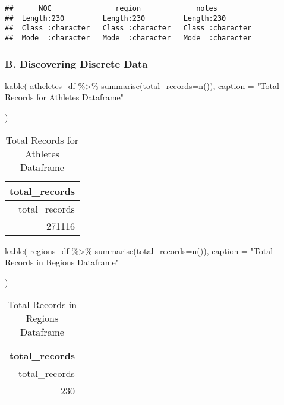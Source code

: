 \documentclass[
]{article}
\newenvironment{Shaded}{\begin{snugshade}}{\end{snugshade}}
\newcommand{\AttributeTok}[1]{\textcolor[rgb]{0.77,0.63,0.00}{#1}}
\newcommand{\FunctionTok}[1]{\textcolor[rgb]{0.00,0.00,0.00}{#1}}
\newcommand{\NormalTok}[1]{#1}
\newcommand{\SpecialCharTok}[1]{\textcolor[rgb]{0.00,0.00,0.00}{#1}}
\newcommand{\StringTok}[1]{\textcolor[rgb]{0.31,0.60,0.02}{#1}}
\begin{document}
\begin{verbatim}
##      NOC               region             notes          
##  Length:230         Length:230         Length:230        
##  Class :character   Class :character   Class :character  
##  Mode  :character   Mode  :character   Mode  :character
\end{verbatim}

\hypertarget{b.-discovering-discrete-data}{%
\subsubsection{B. Discovering Discrete
Data}\label{b.-discovering-discrete-data}}

\begin{Shaded}
\begin{Highlighting}[]
\FunctionTok{kable}\NormalTok{(}
\NormalTok{  atheletes\_df }\SpecialCharTok{\%\textgreater{}\%}
    \FunctionTok{summarise}\NormalTok{(}\AttributeTok{total\_records=}\FunctionTok{n}\NormalTok{()),}
  \AttributeTok{caption =} \StringTok{"Total Records for Athletes Dataframe"}
  
\NormalTok{)}
\end{Highlighting}
\end{Shaded}

\begin{longtable}[]{@{}r@{}}
\caption{Total Records for Athletes Dataframe}\tabularnewline
\toprule
total\_records \\
\midrule
\endfirsthead
\toprule
total\_records \\
\midrule
\endhead
271116 \\
\bottomrule
\end{longtable}

\begin{Shaded}
\begin{Highlighting}[]
\FunctionTok{kable}\NormalTok{(}
\NormalTok{  regions\_df }\SpecialCharTok{\%\textgreater{}\%}
    \FunctionTok{summarise}\NormalTok{(}\AttributeTok{total\_records=}\FunctionTok{n}\NormalTok{()),}
  \AttributeTok{caption =} \StringTok{"Total Records in Regions Dataframe"}
  
\NormalTok{)}
\end{Highlighting}
\end{Shaded}

\begin{longtable}[]{@{}r@{}}
\caption{Total Records in Regions Dataframe}\tabularnewline
\toprule
total\_records \\
\midrule
\endfirsthead
\toprule
total\_records \\
\midrule
\endhead
230 \\
\bottomrule
\end{longtable}
\end{document}
